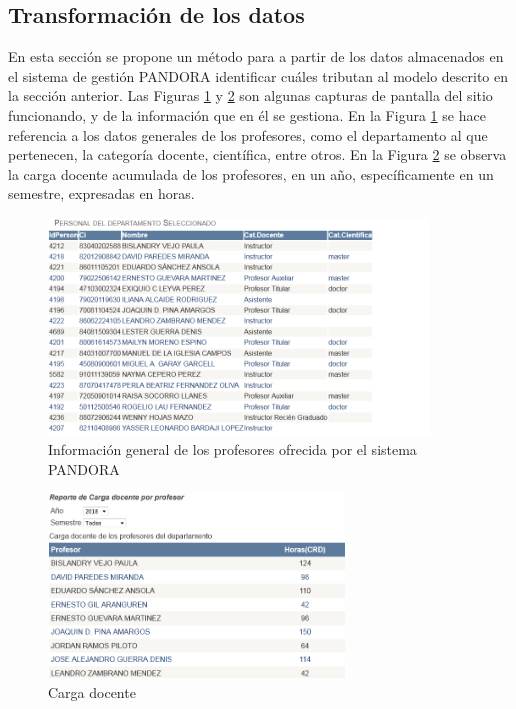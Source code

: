\subsection{Transformación de los datos}

 En esta sección se propone un método para a partir de los datos almacenados en el sistema de gestión PANDORA identificar cuáles tributan al modelo descrito en la sección anterior. Las Figuras \ref{info-gen-prof} y \ref{horas-prof} son algunas capturas de pantalla del sitio funcionando, y de la información que en él se gestiona. En la Figura \ref{info-gen-prof} se hace referencia a los datos generales de los profesores, como el departamento al que pertenecen, la categoría docente, científica, entre otros. En la Figura \ref{horas-prof} se observa la carga docente acumulada de los profesores, en un año, específicamente en un semestre, expresadas en horas.

\begin{figure} [H]
	\centering
	\includegraphics[width=0.9\textwidth]{figuras/catDocCient.png}
	\caption{Información general de los profesores ofrecida por el sistema PANDORA} \label{info-gen-prof}
\end{figure}

\begin{figure} [H]
	\centering
	\includegraphics[width=0.7\textwidth]{figuras/HorasProfesor.png}
	\caption{Carga docente} \label{horas-prof}
\end{figure}

